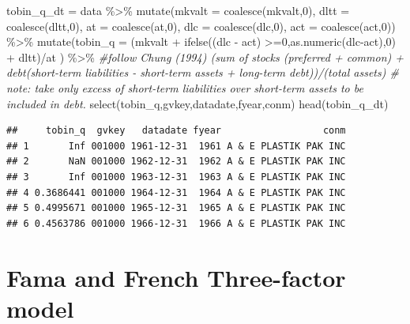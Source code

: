 \documentclass[
]{book}
\newenvironment{Shaded}{\begin{snugshade}}{\end{snugshade}}
\newcommand{\AttributeTok}[1]{\textcolor[rgb]{0.77,0.63,0.00}{#1}}
\newcommand{\CommentTok}[1]{\textcolor[rgb]{0.56,0.35,0.01}{\textit{#1}}}
\newcommand{\DecValTok}[1]{\textcolor[rgb]{0.00,0.00,0.81}{#1}}
\newcommand{\FunctionTok}[1]{\textcolor[rgb]{0.00,0.00,0.00}{#1}}
\newcommand{\NormalTok}[1]{#1}
\newcommand{\OtherTok}[1]{\textcolor[rgb]{0.56,0.35,0.01}{#1}}
\newcommand{\SpecialCharTok}[1]{\textcolor[rgb]{0.00,0.00,0.00}{#1}}
\begin{document}
\begin{Shaded}
\begin{Highlighting}[]
\NormalTok{tobin\_q\_dt }\OtherTok{=}\NormalTok{ data }\SpecialCharTok{\%\textgreater{}\%}
    \FunctionTok{mutate}\NormalTok{(}\AttributeTok{mkvalt =} \FunctionTok{coalesce}\NormalTok{(mkvalt,}\DecValTok{0}\NormalTok{),}
           \AttributeTok{dltt =} \FunctionTok{coalesce}\NormalTok{(dltt,}\DecValTok{0}\NormalTok{),}
           \AttributeTok{at =} \FunctionTok{coalesce}\NormalTok{(at,}\DecValTok{0}\NormalTok{),}
           \AttributeTok{dlc =} \FunctionTok{coalesce}\NormalTok{(dlc,}\DecValTok{0}\NormalTok{),}
           \AttributeTok{act =} \FunctionTok{coalesce}\NormalTok{(act,}\DecValTok{0}\NormalTok{)) }\SpecialCharTok{\%\textgreater{}\%}
    \FunctionTok{mutate}\NormalTok{(}\AttributeTok{tobin\_q =}\NormalTok{ (mkvalt }\SpecialCharTok{+} \FunctionTok{ifelse}\NormalTok{((dlc }\SpecialCharTok{{-}}\NormalTok{ act) }\SpecialCharTok{\textgreater{}=}\DecValTok{0}\NormalTok{,}\FunctionTok{as.numeric}\NormalTok{(dlc}\SpecialCharTok{{-}}\NormalTok{act),}\DecValTok{0}\NormalTok{) }\SpecialCharTok{+}\NormalTok{ dltt)}\SpecialCharTok{/}\NormalTok{at ) }\SpecialCharTok{\%\textgreater{}\%}  \CommentTok{\#follow Chung (1994) (sum of stocks (preferred + common) + debt(short{-}term liabilities {-} short{-}term assets + long{-}term debt))/(total assets) \# note: take only excess of short{-}term liabilities over short{-}term assets to be included in debt. }
    \FunctionTok{select}\NormalTok{(tobin\_q,gvkey,datadate,fyear,conm)}
\FunctionTok{head}\NormalTok{(tobin\_q\_dt)}
\end{Highlighting}
\end{Shaded}

\begin{verbatim}
##     tobin_q  gvkey   datadate fyear                  conm
## 1       Inf 001000 1961-12-31  1961 A & E PLASTIK PAK INC
## 2       NaN 001000 1962-12-31  1962 A & E PLASTIK PAK INC
## 3       Inf 001000 1963-12-31  1963 A & E PLASTIK PAK INC
## 4 0.3686441 001000 1964-12-31  1964 A & E PLASTIK PAK INC
## 5 0.4995671 001000 1965-12-31  1965 A & E PLASTIK PAK INC
## 6 0.4563786 001000 1966-12-31  1966 A & E PLASTIK PAK INC
\end{verbatim}

\hypertarget{fama-and-french-three-factor-model}{%
\section{Fama and French Three-factor model}\label{fama-and-french-three-factor-model}}
\end{document}
